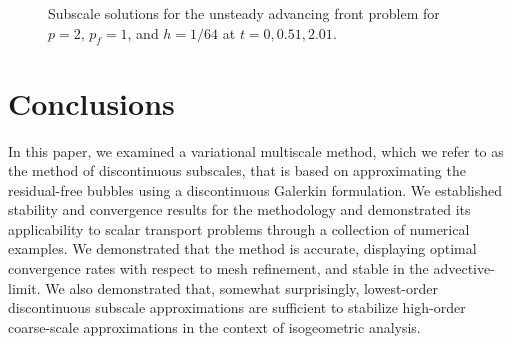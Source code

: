 \documentclass[11pt]{article}
\begin{document}
\begin{figure}[t]
  \begin{center}
	\caption{Subscale solutions for the unsteady advancing front problem for $p = 2$, $p_f = 1$, and $h = 1/64$ at $t = 0, 0.51, 2.01$.}
	\label{fig:advancingfront_fine}
  \end{center}
\end{figure}

\section{Conclusions}

In this paper, we examined a variational multiscale method, which we refer to as the method of discontinuous subscales, that is based on approximating the residual-free bubbles using a discontinuous Galerkin formulation.  We established stability and convergence results for the methodology and demonstrated its applicability to scalar transport problems through a collection of numerical examples.  We demonstrated that the method is accurate, displaying optimal convergence rates with respect to mesh refinement, and stable in the advective-limit.  We also demonstrated that, somewhat surprisingly, lowest-order discontinuous subscale approximations are sufficient to stabilize high-order coarse-scale approximations in the context of isogeometric analysis.
\end{document}
